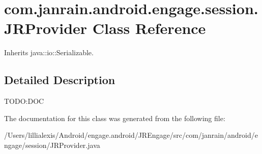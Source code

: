 \hypertarget{classcom_1_1janrain_1_1android_1_1engage_1_1session_1_1_j_r_provider}{
\section{com.janrain.android.engage.session.JRProvider Class Reference}
\label{classcom_1_1janrain_1_1android_1_1engage_1_1session_1_1_j_r_provider}
}


Inherits java::io::Serializable.



\subsection{Detailed Description}
TODO:DOC 

The documentation for this class was generated from the following file:\begin{DoxyCompactItemize}
\item 
/Users/lillialexis/Android/engage.android/JREngage/src/com/janrain/android/engage/session/JRProvider.java\end{DoxyCompactItemize}
